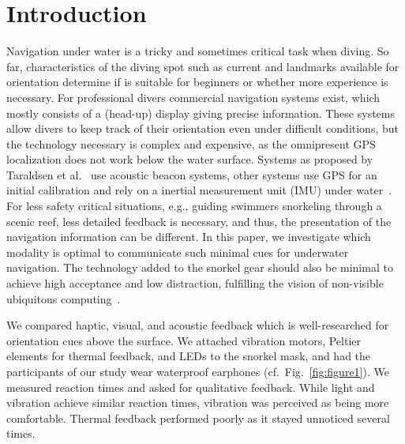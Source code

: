 %

\chapter{Introduction}
\label{introduction}

Navigation under water is a tricky and sometimes critical task when diving. 
So far, characteristics of the diving spot such as current and landmarks available for orientation determine if is suitable for beginners or whether more experience is necessary. 
For professional divers commercial navigation systems exist, which mostly consists of a (head-up) display giving precise information. 
These systems allow divers to keep track of their orientation even under difficult conditions, but the technology necessary is complex and expensive, as the omnipresent GPS localization does not work below the water surface. 
Systems as proposed by Taraldsen et al.~\cite{Taraldsen_UnderwaterGPS} use acoustic beacon systems, other systems use GPS for an initial calibration and rely on a inertial measurement unit (IMU) under water~\cite{Rossi_Performance}.
For less safety critical situations, e.g., guiding swimmers snorkeling through a scenic reef, less detailed feedback is necessary, and thus, the presentation of the navigation information can be different. 
In this paper, we investigate which modality is optimal to communicate such minimal cues for underwater navigation.
The technology added to the snorkel gear should also be minimal to achieve high acceptance and low distraction, fulfilling the vision of non-visible ubiquitous computing~\cite{Weiser:1993:CSI:159544.159617}.

We compared haptic, visual, and acoustic feedback which is well-researched for orientation cues above the surface. 
We attached vibration motors, Peltier elements for thermal feedback, and LEDs to the snorkel mask, and had the participants of our study wear waterproof earphones (cf.\ Fig.~\ref{fig:figure1}). 
We measured reaction times and asked for qualitative feedback.
While light and vibration achieve similar reaction times, vibration was perceived as being more comfortable. 
Thermal feedback performed poorly as it stayed unnoticed several times. 
